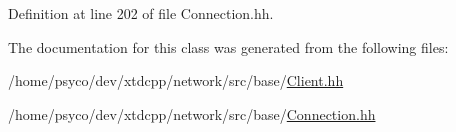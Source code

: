 Definition at line 202 of file Connection.\+hh.



The documentation for this class was generated from the following files\+:\begin{DoxyCompactItemize}
\item 
/home/psyco/dev/xtdcpp/network/src/base/\hyperlink{base_2Client_8hh}{Client.\+hh}\item 
/home/psyco/dev/xtdcpp/network/src/base/\hyperlink{base_2Connection_8hh}{Connection.\+hh}\end{DoxyCompactItemize}
